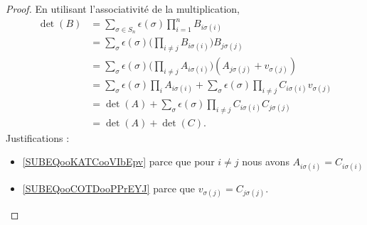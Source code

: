\begin{proof}
    En utilisant l'associativité de la multiplication,
    \begin{subequations}
        \begin{align}
            \det(B)&=\sum_{\sigma\in S_n}\epsilon(\sigma)\prod_{i=1}^nB_{i\sigma(i)}\\
            &=\sum_{\sigma}\epsilon(\sigma)\big( \prod_{i\neq j}B_{i\sigma(i)} \big)B_{j\sigma(j)}\\
            &=\sum_{\sigma}\epsilon(\sigma)\big( \prod_{i\neq j}A_{i\sigma(i)} \big)(A_{j\sigma(j)}+v_{\sigma(j)})\\
            &=\sum_{\sigma}\epsilon(\sigma)\prod_iA_{i\sigma(i)}+\sum_{\sigma}\epsilon(\sigma)\prod_{i\neq j}C_{i\sigma(i)}v_{\sigma(j)}         \label{SUBEQooKATCooVIbEpv}\\
            &=\det(A)+\sum_{\sigma}\epsilon(\sigma)\prod_{i\neq j}C_{i\sigma(i)}C_{j\sigma(j)}  \label{SUBEQooCOTDooPPrEYJ}\\    
            &=\det(A)+\det(C).
        \end{align}
    \end{subequations}
    Justifications :
    \begin{itemize}
        \item \ref{SUBEQooKATCooVIbEpv} parce que pour \( i\neq j\) nous avons \( A_{i\sigma(i)}=C_{i\sigma(i)}\)
        \item \ref{SUBEQooCOTDooPPrEYJ} parce que \( v_{\sigma(j)}=C_{j\sigma(j)}\).
    \end{itemize}
\end{proof}

